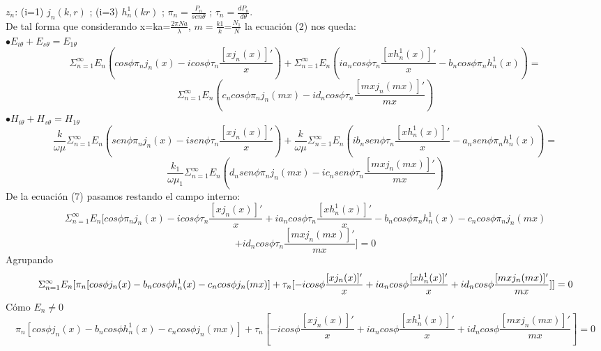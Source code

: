 \documentclass[11pt]{article}
\begin{document}
$z_{n}$: (i=1) $j_{n}(k,r)$ ; (i=3) $h_{n}^{1}(kr)$ ; $\pi_{n}=\frac{P_{n}}{sen\theta}$ ; $\tau_{n}=\frac{dP_{n}}{d\theta}$.
\\
De tal forma que considerando x=ka=$\frac{2\pi Na}{\lambda}$, $m=\frac{k1}{k}$=$\frac{N_{1}}{N}$ la ecuación (2) nos queda:
\\
$\bullet E_{i\theta}+E_{s\theta}=E_{1\theta}$
\begin{equation}
\Sigma_{n=1}^{\infty}E_{n}(cos\phi \pi_{n} j_{n}(x)-icos\phi\tau_{n}\frac{[xj_{n}(x)]'}{x})+\Sigma_{n=1}^{\infty}E_{n}(ia_{n}cos\phi \tau_{n} \frac{[xh_{n}^{1}(x)]'}{x}-b_{n}cos\phi\pi_{n}h_{n}^{1}(x))=
\end{equation}
\begin{equation*}
\Sigma_{n=1}^{\infty}E_{n}(c_{n}cos\phi\pi_{n}j_{n}(mx)-id_{n}cos\phi\tau_{n}\frac{[mxj_{n}(mx)]'}{mx})
\end{equation*}
$\bullet H_{i\theta}+H_{s\theta}=H_{1\theta}$
\begin{equation}
\frac{k}{\omega \mu} \Sigma_{n=1}^{\infty} E_{n}(sen\phi \pi_{n}j_{n}(x)-isen\phi\tau_{n}\frac{[xj_{n}(x)]'}{x})+\frac{k}{\omega \mu} \Sigma_{n=1}^{\infty} E_{n}(ib_{n}sen\phi\tau_{n}\frac{[xh_{n}^{1}(x)]'}{x}-a_{n}sen\phi\pi_{n}h_{n}^{1}(x))=
\end{equation}
\begin{equation*}
\frac{k_{1}}{\omega \mu_{1}} \Sigma_{n=1}^{\infty} E_{n}(d_{n}sen\phi \pi_{n}j_{n}(mx)-ic_{n}sen\phi \tau_{n}\frac{[mxj_{n}(mx)]'}{mx})
\end{equation*}
De la ecuación (7) pasamos restando el campo interno:
\begin{equation}
\Sigma_{n=1}^{\infty} E_{n}[cos\phi \pi_{n} j_{n}(x)-icos\phi\tau_{n}\frac{[xj_{n}(x)]'}{x}+ia_{n}cos\phi \tau_{n} \frac{[xh_{n}^{1}(x)]'}{x}-b_{n}cos\phi\pi_{n}h_{n}^{1}(x)-c_{n}cos\phi\pi_{n}j_{n}(mx)
\end{equation}
\begin{equation*}
+id_{n}cos\phi\tau_{n}\frac{[mxj_{n}(mx)]'}{mx}]=0
\end{equation*}
Agrupando
\begin{equation}
\small
\Sigma_{n=1}^{\infty} E_{n}[\pi_{n}[cos\phi  j_{n}(x)-b_{n}cos\phi h_{n}^{1}(x)-c_{n}cos\phi j_{n}(mx)]+\tau_{n}[-icos\phi\frac{[xj_{n}(x)]'}{x}+ia_{n}cos\phi \frac{[xh_{n}^{1}(x)]'}{x}+id_{n}cos\phi\frac{[mxj_{n}(mx)]'}{mx}]]=0
\end{equation}
\smallskip
Cómo $E_{n}\neq0$
\begin{equation}
\pi_{n}[cos\phi  j_{n}(x)-b_{n}cos\phi h_{n}^{1}(x)-c_{n}cos\phi j_{n}(mx)]+\tau_{n}[-icos\phi\frac{[xj_{n}(x)]'}{x}+ia_{n}cos\phi \frac{[xh_{n}^{1}(x)]'}{x}+id_{n}cos\phi\frac{[mxj_{n}(mx)]'}{mx}]=0
\end{equation}
\end{document}
